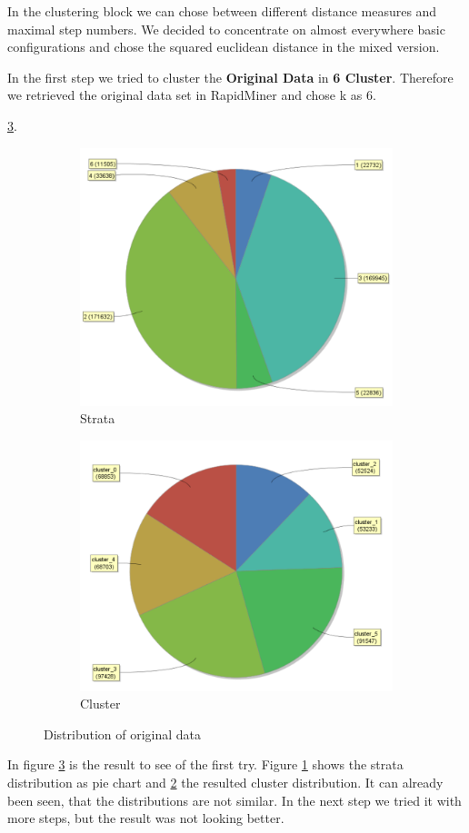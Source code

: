 In the clustering block we can chose between different distance measures and maximal step numbers. We decided to concentrate on almost everywhere basic configurations and chose the squared euclidean distance in the mixed version.

In the first step we tried to cluster the \textbf{Original Data} in \textbf{6 Cluster}. Therefore we retrieved the original data set in RapidMiner and chose k as 6.

\ref{fig:OrgDist}. 
\begin{figure}[!htbp]
\centering
\begin{subfigure}{.5\textwidth}
  \centering
  \includegraphics[width=.4\linewidth]{ClusterOrigRapidStrata.PNG}
  \caption{Strata}
  \label{fig:OrgSt}
\end{subfigure}%
\begin{subfigure}{.5\textwidth}
  \centering
  \includegraphics[width=.4\linewidth]{ClusterOrigRapidCluster.PNG}
  \caption{Cluster}
  \label{fig:OrgCl}
\end{subfigure}
\caption{Distribution of original data}
\label{fig:OrgDist}
\end{figure}

In figure \ref{fig:OrgDist} is the result to see of the first try. Figure \ref{fig:OrgSt} shows the strata distribution as pie chart and \ref{fig:OrgCl} the resulted cluster distribution. It can already been seen, that the distributions are not similar. In the next step we tried it with more steps, but the result was not looking better.

